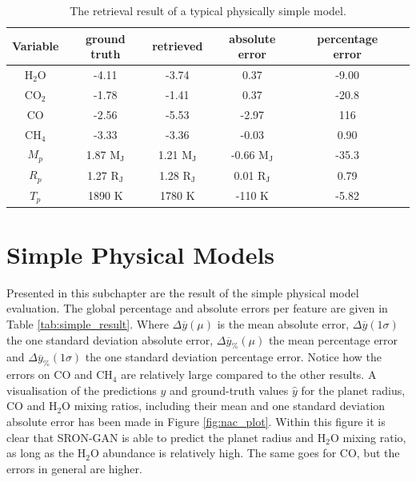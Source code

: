 \begin{table}[!htb]
\centering
\caption{The retrieval result of a typical physically simple model.}
\label{tab:single_simple_result}
\begin{tabular}{|c|c|c|c|c|c|}
\hline
\textbf{Variable} & \textbf{ground truth} & \textbf{retrieved} & \textbf{absolute error} & \textbf{percentage error} \\ \hline
$\mathrm{H_2O}$               & -4.11                 & -3.74              & 0.37                    & -9.00                     \\ \hline
$\mathrm{CO_2}$               & -1.78                 & -1.41              & 0.37                    & -20.8                    \\ \hline
$\mathrm{CO}$                & -2.56                 & -5.53              & -2.97                   & 116                    \\ \hline
$\mathrm{CH_4}$               & -3.33                 & -3.36              & -0.03                   & 0.90                      \\ \hline
$M_p$                & 1.87 $\mathrm{M_J}$                  & 1.21 $\mathrm{M_J}$               & -0.66 $\mathrm{M_J}$                   & -35.3                    \\ \hline
$R_p$                & 1.27 $\mathrm{R_J}$                  & 1.28 $\mathrm{R_J}$               & 0.01 $\mathrm{R_J}$                    & 0.79                      \\ \hline
$T_p$                & 1890 K                  & 1780 K               & -110 K                    & -5.82                     \\ \hline
\end{tabular}
\end{table}






\section{Simple Physical Models}
Presented in this subchapter are the result of the simple physical model evaluation. The global percentage and absolute errors per feature are given in Table \ref{tab:simple_result}. Where $\Delta \overline{y} (\mu)$ is the mean absolute error, $\Delta \overline{y} (1\sigma)$ the one standard deviation absolute error, $\Delta \overline{y}_\% (\mu)$ the mean percentage error and $\Delta \overline{y}_\% (1\sigma)$ the one standard deviation percentage error. Notice how the errors on CO and CH$_4$ are relatively large compared to the other results. A visualisation of the predictions $y$ and ground-truth values $\hat{y}$ for the planet radius, CO and H$_2$O mixing ratios, including their mean and one standard deviation absolute error has been made in Figure \ref{fig:nac_plot}. Within this figure it is clear that SRON-GAN is able to predict the planet radius and H$_2$O mixing ratio, as long as the H$_2$O abundance is relatively high. The same goes for CO, but the errors in general are higher. 

